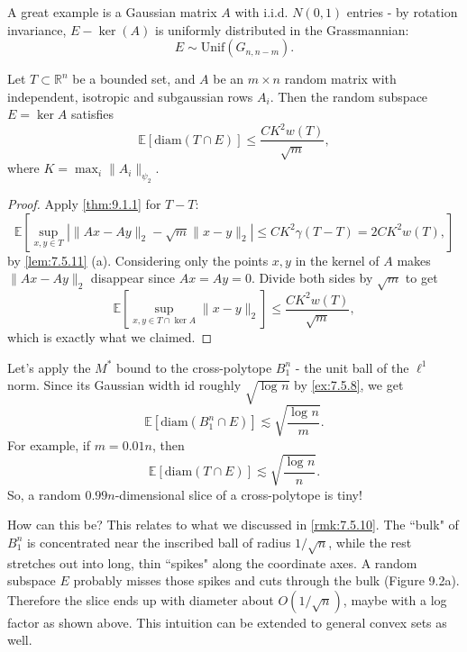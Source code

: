 A great example is a Gaussian matrix $A$ with i.i.d. $N(0, 1)$ entries - by rotation invariance, $E - \ker{(A)}$ 
is uniformly distributed in the Grassmannian:
\[ E \sim \mathrm{Unif}(G_{n, n - m}). \]

\begin{theorem}[$M^*$ bound]
\label{thm:9.3.1}
Let $T \subset \mathbb{R}^n$ be a bounded set, and $A$ be an $m \times n$ random matrix with independent, 
isotropic and subgaussian rows $A_i$. Then the random subspace $E = \ker{A}$ satisfies 
\[ \mathbb{E}\left[ \mathrm{diam}(T \cap E) \right] \leq \frac{CK^2 w(T)}{\sqrt{m}}, \]
where $K = \max_{i}\lVert A_i \rVert_{\psi_2}$.
\end{theorem}

\begin{proof}
Apply \cref{thm:9.1.1} for $T - T$:
\[ \mathbb{E}\left[ \sup_{x, y \in T} \left| \lVert Ax - Ay \rVert_{2} - \sqrt{m}\lVert x - y \rVert_{2} \right| 
\leq CK^2 \gamma(T - T) = 2CK^2 w(T), \right] \]
by \cref{lem:7.5.11} (a). Considering only the points $x, y$ in the kernel of $A$ makes $\lVert Ax - Ay 
\rVert_{2}$ disappear since $Ax = Ay = 0$. Divide both sides by $\sqrt{m}$ to get 
\[ \mathbb{E}\left[ \sup_{x, y \in T \cap \ker{A}} \lVert x - y \rVert_{2} \right] 
\leq \frac{CK^2 w(T)}{\sqrt{m}}, \]
which is exactly what we claimed.
\end{proof}

\begin{example}
Let's apply the $M^*$ bound to the cross-polytope $B_1^n$ - the unit ball of the $\ell^1$ norm. Since its 
Gaussian width id roughly $\sqrt{\log_{}{n}}$ by \cref{ex:7.5.8}, we get 
\[ \mathbb{E}\left[ \mathrm{diam}(B_1^n \cap E) \right] \lesssim \sqrt{\frac{\log_{}{n}}{m}}. \]
For example, if $m = 0.01n$, then 
\[ \mathbb{E}\left[ \mathrm{diam}(T \cap E) \right] \lesssim \sqrt{\frac{\log_{}{n}}{n}}. \]
So, a random $0.99n$-dimensional slice of a cross-polytope is tiny!
\end{example}

How can this be? This relates to what we discussed in \cref{rmk:7.5.10}. The ``bulk" of $B_1^n$ is concentrated 
near the inscribed ball of radius $1/\sqrt{n}$, while the rest stretches out into long, thin ``spikes" along 
the coordinate axes. A random subspace $E$ probably misses those spikes and cuts through the bulk (Figure 9.2a). 
Therefore the slice ends up with diameter about $O(1/\sqrt{n})$, maybe with a log factor as shown above. This 
intuition can be extended to general convex sets as well.

